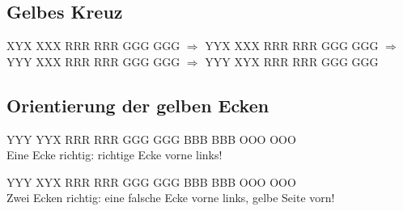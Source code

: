 \documentclass[9pt]{scrartcl}
\newcommand{\Algo}[1]{\ShowSequence{\ }{\textRubik}{#1}}
\begin{document}
\subsection*{Gelbes Kreuz}
\RubikCubeGreyAll%
            {X}{Y}{X}
            {X}{X}{X}%
               {R}{R}{R}
	       {R}{R}{R}%
	       {G}{G}{G}
	       {G}{G}{G}%
$\Longrightarrow$
\RubikCubeGreyAll%
            {Y}{Y}{X}
            {X}{X}{X}%
               {R}{R}{R}
	       {R}{R}{R}%
	       {G}{G}{G}
	       {G}{G}{G}%
$\Longrightarrow$
\RubikCubeGreyAll%
            {Y}{Y}{Y}
            {X}{X}{X}%
               {R}{R}{R}
	       {R}{R}{R}%
	       {G}{G}{G}
	       {G}{G}{G}%
$\Longrightarrow$
\RubikCubeGreyAll%
            {Y}{Y}{Y}
            {X}{Y}{X}%
               {R}{R}{R}
	       {R}{R}{R}%
	       {G}{G}{G}
	       {G}{G}{G}%
\\[1ex]
\Algo{F, R, U, Rp, Up, Fp}

\subsection*{Orientierung der gelben Ecken}
\parbox{0.5\linewidth}{
  \RubikCubeGreyAll%
	      {Y}{Y}{Y}
	      {Y}{Y}{X}%
		 {R}{R}{R}
		 {R}{R}{R}%
		 {G}{G}{G}
		 {G}{G}{G}%
		{B}{B}{B}
		{B}{B}{B}%
		{O}{O}{O}
		{O}{O}{O}%
  \\[1em]
  Eine Ecke richtig: richtige Ecke vorne links!
}%
\parbox{0.5\linewidth}{
  \RubikCubeGreyAll%
	      {Y}{Y}{Y}
	      {X}{Y}{X}%
		 {R}{R}{R}
		 {R}{R}{R}%
		 {G}{G}{G}
		 {G}{G}{G}%
		{B}{B}{B}
		{B}{B}{B}%
		{O}{O}{O}
		{O}{O}{O}%
  \\[1em]
  Zwei Ecken richtig: eine falsche Ecke vorne links, gelbe Seite vorn!
}\\[1em]
\end{document}

